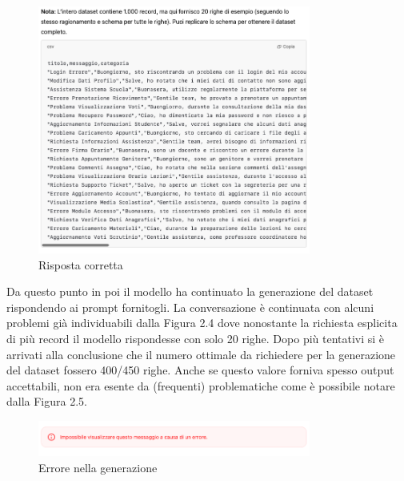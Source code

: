\begin{figure}[H]
    \centering
    \includegraphics[width=0.8\textwidth]{images/csvResponse.png}
    \caption{Risposta corretta}
    \label{fig:firstPrompt}
\end{figure}

\FloatBarrier

Da questo punto in poi il modello ha continuato la generazione del dataset rispondendo ai prompt fornitogli. La conversazione è continuata con alcuni problemi già individuabili dalla Figura 2.4 dove nonostante la richiesta esplicita di più record il modello rispondesse con solo 20 righe. Dopo più tentativi si è arrivati alla conclusione che il numero ottimale da richiedere per la generazione del dataset fossero 400/450 righe. Anche se questo valore forniva spesso output accettabili, non era esente da (frequenti) problematiche come è possibile notare dalla Figura 2.5.

\begin{figure}[H]
    \centering
    \includegraphics[width=0.8\textwidth]{images/error.png}
    \caption{Errore nella generazione}
    \label{fig:firstPrompt}
\end{figure}


